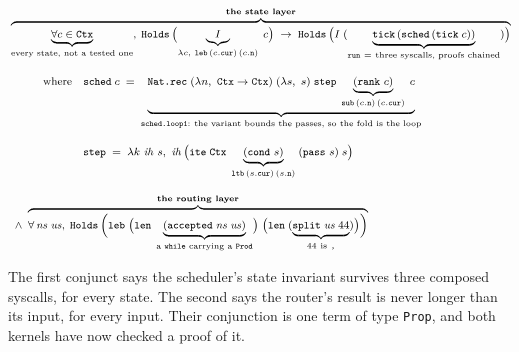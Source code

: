 \documentclass[11pt]{article}
\newcommand{\code}[1]{\texttt{#1}}
\begin{document}
\begin{equation}
\label{eq:crustos}
\footnotesize
\begin{aligned}
&\overbrace{
  \underbrace{\forall c \in \ctx}_{\text{every state, not a tested one}},\;
  \hld\,\bigl(\underbrace{I}_{\lambda c,\ \code{leb}\,(\cur{c})\,(\nth{c})}\; c\bigr)
  \;\to\;
  \hld\,\bigl(I\;(\underbrace{\code{tick}\,(\code{sched}\,(\code{tick}\;c))}_{\code{run}\ =\ \text{three syscalls, proofs chained}})\bigr)
}^{\textbf{the state layer}}
\\[2.2ex]
&\hspace{3em}\text{where}\quad
\code{sched}\;c \;=\;
\underbrace{
  \code{Nat.rec}\;(\lambda n,\ \ctx \to \ctx)\;(\lambda s,\ s)\;\code{step}\;
  \underbrace{(\code{rank}\ c)}_{\code{sub}\,(\nth{c})\,(\cur{c})}\;c
}_{\code{sched.loop1}:\ \text{the variant bounds the passes, so the fold is the loop}}
\\[2.2ex]
&\hspace{3em}\phantom{\text{where}}\quad
\code{step} \;=\;
\lambda k\ \mathit{ih}\ s,\ \mathit{ih}\,\bigl(\code{ite}\;\ctx\;
    \underbrace{(\code{cond}\ s)}_{\code{ltb}\,(\cur{s})\,(\nth{s})}\;
    (\code{pass}\ s)\;s\bigr)
\\[2.2ex]
&\;\wedge\;
\overbrace{
  \forall\,\mathit{ns}\;\mathit{us},\;
  \hld\,\Bigl(\code{leb}\;
    \bigl(\code{len}\;\underbrace{(\code{accepted}\;\mathit{ns}\;\mathit{us})}_{\text{a \code{while} carrying a } \code{Prod}}\bigr)\;
    \bigl(\code{len}\;(\underbrace{\code{split}\;\mathit{us}\;44}_{44\ \text{is}\ \code{,}})\bigr)\Bigr)
}^{\textbf{the routing layer}}
\end{aligned}
\end{equation}

The first conjunct says the scheduler's state invariant survives three
composed syscalls, for every state. The second says the router's result is
never longer than its input, for every input. Their conjunction is one term of
type \code{Prop}, and both kernels have now checked a proof of it.
\end{document}
